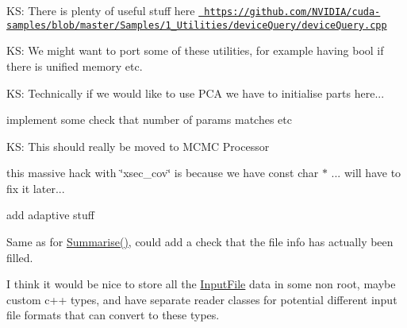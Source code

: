
\begin{DoxyRefList}
\item[Member \mbox{\hyperlink{gpuUtils_8cuh_ace64b352b82023c1dc75e981ef999197}{\+\_\+\+\_\+cuda\+Safe\+Call}} (cuda\+Error err, const char $\ast$file, const int line)]\label{todo__todo000001}%
%
KS\+: There is plenty of useful stuff here \href{https://github.com/NVIDIA/cuda-samples/blob/master/Samples/1_Utilities/deviceQuery/deviceQuery.cpp}{\texttt{ https\+://github.\+com/\+NVIDIA/cuda-\/samples/blob/master/\+Samples/1\+\_\+\+Utilities/device\+Query/device\+Query.\+cpp}} 



KS\+: We might want to port some of these utilities, for example having bool if there is unified memory etc.  
\item[Member \mbox{\hyperlink{classcovarianceOsc_a05b22b92594371c86a5e28f73cf4a574}{covariance\+Osc\+::covariance\+Osc}} (const std\+::vector$<$ std\+::string $>$ \&File\+Names, std\+::string name=\char`\"{}osc\+\_\+cov\char`\"{}, double threshold=-\/1, int First\+PCAdpar=-\/999, int Last\+PCAdpar=-\/999)]\label{todo__todo000029}%
%
KS\+: Technically if we would like to use PCA we have to initialise parts here...  
\item[Member \mbox{\hyperlink{classFitterBase_a655ccea31627627e2b36745c97e5c0f0}{Fitter\+Base\+::Start\+From\+Previous\+Fit}} (const std\+::string \&Fit\+Name)]\label{todo__todo000006}%
%
implement some check that number of params matches etc  
\item[File \mbox{\hyperlink{GetPenaltyTerm_8cpp}{Get\+Penalty\+Term.cpp}} ]\label{todo__todo000013}%
%
KS\+: This should really be moved to MCMC Processor  
\item[Member \mbox{\hyperlink{MaCh3Factory_8h_adf686154f88c21b8937a8c9062d41644}{Ma\+Ch3\+Covariance\+Factory}} (manager $\ast$fit\+Man, const std\+::string \&Pre\+Fix)]\label{todo__todo000007}%
%
this massive hack with \char`\"{}xsec\+\_\+cov\char`\"{} is because we have const char $\ast$ ... will have to fix it later... 

\label{todo__todo000008}%
%
add adaptive stuff  
\item[Member \mbox{\hyperlink{structMaCh3Plotting_1_1InputFile_a0897b76fdbfc674ed94da1d2b4adb0a2}{Ma\+Ch3\+Plotting\+::Input\+File\+::Dump}} () const]\label{todo__todo000018}%
%
Same as for \mbox{\hyperlink{structMaCh3Plotting_1_1InputFile_a4b3753ca1fa1a399e519aa15bca8658a}{Summarise()}}, could add a check that the file info has actually been filled.  
\item[Member \mbox{\hyperlink{structMaCh3Plotting_1_1InputFile_a7491ea81990748b02402796ee512f518}{Ma\+Ch3\+Plotting\+::Input\+File\+::has\+LLHScans}} ]\label{todo__todo000019}%
%
I think it would be nice to store all the \mbox{\hyperlink{structMaCh3Plotting_1_1InputFile}{Input\+File}} data in some non root, maybe custom c++ types, and have separate reader classes for potential different input file formats that can convert to these types. 




\end{DoxyRefList}
